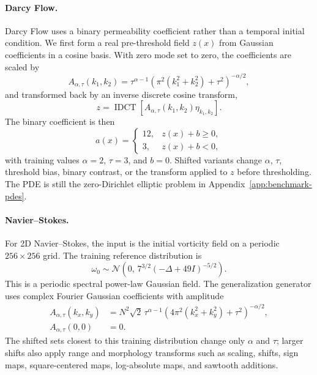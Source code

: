 \documentclass[letterpaper]{article} %
\newcommand{\appref}[1]{Appendix~\ref{#1}}
\begin{document}
\paragraph{Darcy Flow.}
Darcy Flow uses a binary permeability coefficient rather than a temporal
initial condition. We first form a real pre-threshold field $z(x)$ from
Gaussian coefficients in a cosine basis. With zero mode set to zero, the
coefficients are scaled by
\begin{equation}
  A_{\alpha,\tau}(k_1,k_2)
  =
  \tau^{\alpha-1}
  \left(
    \pi^2(k_1^2+k_2^2)+\tau^2
  \right)^{-\alpha/2},
\end{equation}
and transformed back by an inverse discrete cosine transform,
\begin{equation}
  z
  =
  \operatorname{IDCT}
  \left[
    A_{\alpha,\tau}(k_1,k_2)\eta_{k_1,k_2}
  \right].
\end{equation}
The binary coefficient is then
\begin{equation}
  a(x)=
  \begin{cases}
    12, & z(x)+b\ge 0,\\
    3, & z(x)+b<0,
  \end{cases}
\end{equation}
with training values $\alpha=2$, $\tau=3$, and $b=0$. Shifted variants change
$\alpha$, $\tau$, threshold bias, binary contrast, or the transform applied to
$z$ before thresholding. The PDE is still the zero-Dirichlet elliptic problem in
\appref{app:benchmark-pdes}.

\paragraph{Navier--Stokes.}
For 2D Navier--Stokes, the input is the initial vorticity field on
a periodic $256\times256$ grid. The training reference distribution is
\begin{equation}
  \omega_0
  \sim
  \mathcal N
  \left(
    0,\,
    7^{3/2}(-\Delta+49I)^{-5/2}
  \right).
\end{equation}
This is a periodic spectral power-law Gaussian field. The generalization generator uses
complex Fourier Gaussian coefficients with amplitude
\begin{align}
  A_{\alpha,\tau}(k_x,k_y)
  &=
  N^2\sqrt{2}\,
  \tau^{\alpha-1}
  \left(
    4\pi^2(k_x^2+k_y^2)+\tau^2
  \right)^{-\alpha/2},
  \nonumber\\
  A_{\alpha,\tau}(0,0)
  &=0 .
\end{align}
The shifted sets closest to this training distribution change only $\alpha$ and
$\tau$; larger shifts also apply range and morphology transforms such as scaling,
shifts, sign maps, square-centered maps, log-absolute maps, and sawtooth
additions.
\end{document}

